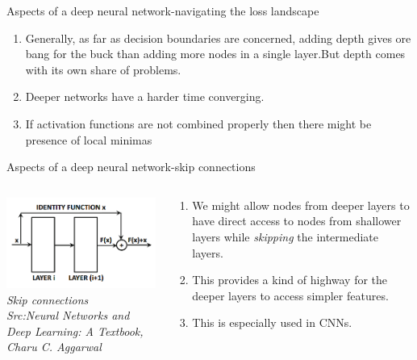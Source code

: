 \begin{frame}{Aspects of a deep neural network-navigating the loss landscape}
	\begin{enumerate}[$\bullet$]
		\item Generally, as far as decision boundaries are concerned, adding depth gives ore bang for the buck than adding more nodes in a single layer.\pause But depth comes with its own share of problems.\pause
		\item Deeper networks have a harder time converging.\pause
		\item If activation functions are not combined properly then there might be presence of local minimas
	\end{enumerate}
\end{frame}
\begin{frame}{Aspects of a deep neural network-skip connections}
	\begin{columns}[T]
        \begin{column}{0.4\textwidth}
        	\includegraphics[width=\textwidth]{images/skip.png}
			\tiny{\textit{Skip connections\\ Src:Neural Networks and Deep Learning: A Textbook, Charu C. Aggarwal}}
        \end{column}
	    \begin{column}{0.6\textwidth} 
			\begin{enumerate}[$\bullet$]
				\item We might allow nodes from deeper layers to have direct access to nodes from shallower layers while \textit{skipping} the intermediate layers.\pause
				\item This provides a kind of highway for the deeper layers to access simpler features.\pause
				\item This is especially used in CNNs.
			\end{enumerate}
    	\end{column}
    \end{columns}
\end{frame}
